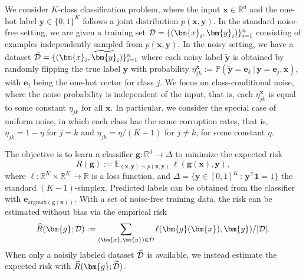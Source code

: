 \documentclass[letterpaper]{article} %
\newcommand{\R}{{\mathbb{R}}}
\newcommand{\Em}{{\mathbb{E}}}
\newcommand{\Pm}{{\mathbb{P}}}
\newcommand{\bx}{{\bm{x}}}
\newcommand{\bg}{{\bm{g}}}
\newcommand{\by}{{\bm{y}}}
\newcommand{\be}{{\bm{e}}}
\newcommand{\T}{{\mathsf{T}}}
\newcommand{\gvn}{\,|\,}
\newcommand{\cD}{{\cal{D}}}
\newcommand{\simplex}{\Delta}
\newcommand{\argmax}{\mathrm{argmax}}
\begin{document}
We consider $K$-class classification problem, where the input
$\bx\in\R^d$ and the one-hot label $\by\in\{0,1\}^K$ follows a joint
distribution $p(\bx,\by)$.
In the standard noise-free setting, we are given a training set
$\cD=\{(\bx_i,\by_i)\}_{i=1}^n$ consisting of examples independently sampled
from $p(\bx, \by)$.
In the noisy setting, we have a dataset
$\widetilde{\cD}=\{(\bx_i,\widetilde{\by}_i)\}_{i=1}^n$ 
where each noisy label $\widetilde{\by}$ is obtained by randomly flipping the
true label $\by$ with probability 
$\eta_{jk}^{\bx} := \Pm(\widetilde{\by} = \be_k\gvn \by = \be_j,\bx)$,
with $\be_{j}$ being the one-hot vector for class $j$.
We focus on class-conditional noise, where 
the noise probability is independent of the input, that is, each
$\eta_{jk}^{\bx}$ is equal to some constant $\eta_{jk}$ for all $\bx$.
In particular, we consider the special case of uniform noise, in which each
class has the same corruption rates, that is, $\eta_{jk}=1-\eta$ for $j=k$ and
$\eta_{jk}=\eta/(K-1)$ for $j\ne k$, for some constant $\eta$.

The objective is to learn a classifier $\bg:\R^d\to \simplex$ to minimize the expected risk
\[
    R(\bg) := \Em_{(\bx,\by)\sim p(\bx,\by)}\, \ell(\bg(\bx),\by),
\]
where $\ell:\R^{K}\times \R^K\to \R$ is a loss function, and  
$\simplex = \{\by\in [0,1]^K\,:\, \by^\T\bm{1}=1\}$ the standard
$(K-1)$-simplex.
Predicted labels can be obtained from the classifier with $\be_{\argmax(\bg(\bx))}$. 
With a set of noise-free training data, the risk can be estimated without bias via the empirical risk 
\[
    \widehat{R}(\bg;\cD) := \sum_{(\bx,\by)\in\cD} \ell(\bg(\bx),\by) / |\cD|.
\]
When only a noisily labeled dataset $\widetilde{\cD}$ is available, we instead
estimate the expected risk with $\widehat{R}(\bg;\widetilde{\cD})$.
\end{document}
